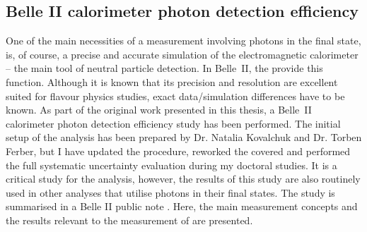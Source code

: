 \subsection{Belle II calorimeter photon detection efficiency}\label{sec:photon_efficiency}

One of the main necessities of a measurement involving photons in the final state, is, of course, a precise and accurate simulation of the electromagnetic calorimeter -- the main tool of neutral particle detection.
In Belle~II, the \ECL provide this function.
Although it is known that its precision and resolution are excellent suited for flavour physics studies, exact data/simulation differences have to be known.
As part of the original work presented in this thesis, a Belle~II calorimeter photon detection efficiency study has been performed.
The initial setup of the analysis has been prepared by Dr. Natalia Kovalchuk and Dr. Torben Ferber, but I have updated the procedure, reworked the covered
and performed the full systematic uncertainty evaluation during my doctoral studies.
It is a critical study for the \BtoXsgamma analysis, however, the results of this study are also routinely used in other analyses that utilise photons in their final states.
The study is summarised in a Belle II public note \cite{Henrikas:2604}.
Here, the main measurement concepts and the results relevant to the measurement of \BtoXsgamma are presented.

